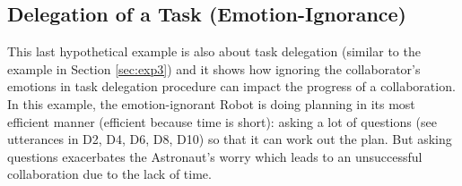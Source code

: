 \subsection{Delegation of a Task (Emotion-Ignorance)}
\label{sec:exp4}

This last hypothetical example is also about task delegation (similar to the
example in Section \ref{sec:exp3}) and it shows how ignoring the collaborator's
emotions in task delegation procedure can impact the progress of a
collaboration. In this example, the emotion-ignorant Robot is doing planning in
its most efficient manner (efficient because time is short): asking a lot of
questions (see utterances in D2, D4, D6, D8, D10) so that it can work out the
plan. But asking questions exacerbates the Astronaut's worry which leads to an
unsuccessful collaboration due to the lack of time. 

